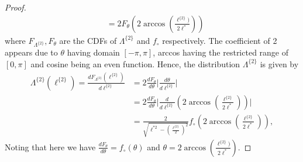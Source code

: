 \documentclass[10pt,a4paper]{amsart}
\begin{document}
\begin{proof}
\begin{align}
       &=2F_\theta\left(2\arccos{\left(\frac{\ell^{\{2\}})}{2\ell^*}\right)}\right)
   \end{align}
   where $F_{\Lambda^{\{2\}}}, F_\theta$ are the CDFs of $\Lambda^{\{2\}}$ and $f_\circ$ respectively.  The coefficient of 2 appears due to $\theta$ having domain $[-\pi,\pi]$, arccos having the restricted range of $[0,\pi]$ and cosine being an even function.  Hence, the distribution $\Lambda^{\{2\}}$ is given by
   \begin{align}\nonumber
       \Lambda^{\{2\}}(\ell^{\{2\}})=\frac{dF_{\Lambda^{\{2\}}}(\ell^{\{2\}})}{d\ell^{\{2\}}}&=2\frac{dF_\theta}{d\theta}\Bigg\lvert\frac{d\theta}{d\ell^{\{2\}}}\Bigg\rvert\\\nonumber
       &=2\frac{dF_\theta}{d\theta}\Bigg\lvert\frac{d}{d\ell^{\{2\}}}\left(2\arccos{\left(\frac{\ell^{\{2\}}}{2\ell^*}\right)}\right)\Bigg\rvert\\
       &=\frac{2}{\sqrt{\ell^{*2}-\left(\frac{\ell^{\{2\}}}{2}\right)^2}}f_\circ\left(2\arccos{\left(\frac{\ell^{\{2\}}}{2\ell^*}\right)}\right),
   \end{align}
Noting that here we have $\frac{dF_\theta}{d\theta}=f_\circ(\theta)$ and $\theta=2\arccos{\left(\frac{\ell^{\{2\}})}{2\ell^*}\right)}$.
\end{proof}
\end{document}
